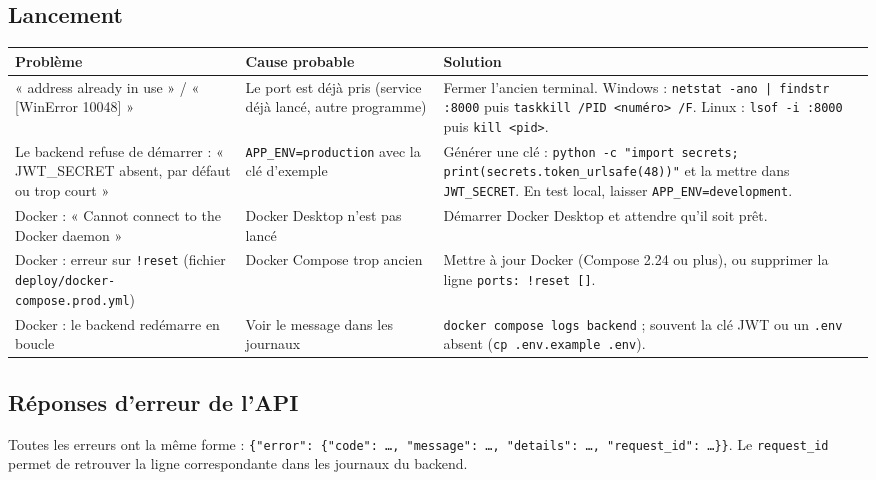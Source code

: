 \documentclass[11pt,a4paper]{article}
\begin{document}
\subsection{Lancement}
\begin{center}
\small
\begin{longtable}{L{4.6cm}L{4cm}L{6.4cm}}
\toprule
\textbf{Problème} & \textbf{Cause probable} & \textbf{Solution} \\
\midrule
\endhead
« address already in use » / « [WinError 10048] » & Le port est déjà pris (service déjà lancé, autre programme) & Fermer l'ancien terminal. Windows : \texttt{netstat -ano | findstr :8000} puis \texttt{taskkill /PID <numéro> /F}. Linux : \texttt{lsof -i :8000} puis \texttt{kill <pid>}. \\
Le backend refuse de démarrer : « JWT\_SECRET absent, par défaut ou trop court » & \texttt{APP\_ENV=production} avec la clé d'exemple & Générer une clé : \texttt{python -c "import secrets; print(secrets.token\_urlsafe(48))"} et la mettre dans \texttt{JWT\_SECRET}. En test local, laisser \texttt{APP\_ENV=development}. \\
Docker : « Cannot connect to the Docker daemon » & Docker Desktop n'est pas lancé & Démarrer Docker Desktop et attendre qu'il soit prêt. \\
Docker : erreur sur \texttt{!reset} (fichier \texttt{deploy/docker-compose.prod.yml}) & Docker Compose trop ancien & Mettre à jour Docker (Compose 2.24 ou plus), ou supprimer la ligne \texttt{ports: !reset []}. \\
Docker : le backend redémarre en boucle & Voir le message dans les journaux & \texttt{docker compose logs backend} ; souvent la clé JWT ou un \texttt{.env} absent (\texttt{cp .env.example .env}). \\
\bottomrule
\end{longtable}
\end{center}

\subsection{Réponses d'erreur de l'API}
Toutes les erreurs ont la même forme : \texttt{\{"error": \{"code": …, "message": …, "details": …, "request\_id": …\}\}}.
Le \texttt{request\_id} permet de retrouver la ligne correspondante dans les journaux du backend.
\end{document}
